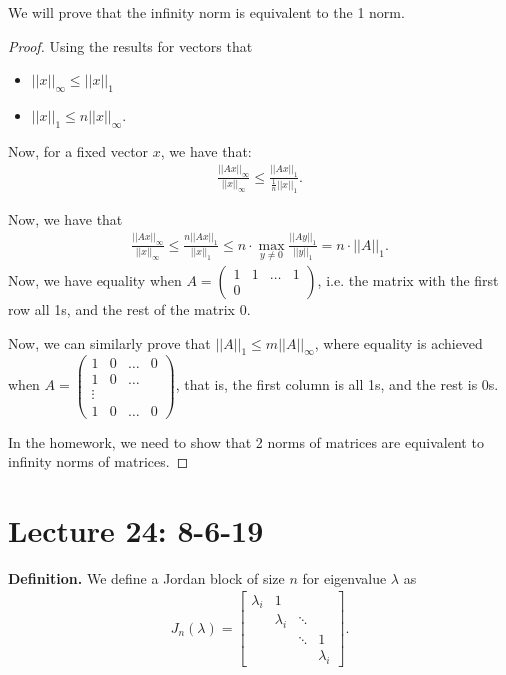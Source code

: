 \documentclass{article}
\newcommand{\mat}[1]{\begin{pmatrix}#1\end{pmatrix}}
\begin{document}
We will prove that the infinity norm is equivalent to the 1 norm.  
\begin{proof}
  Using the results for vectors that
  \begin{itemize}
    \item $||x||_{\infty} \leq ||x||_1$
    \item $||x||_{1} \leq n ||x||_{\infty}$.
  \end{itemize}

  Now, for a fixed vector $x$, we have that:
\begin{align*}
  \frac{||A x||_{\infty}}{||x||_{\infty}} \leq \frac{||A x||_1}{\frac{1}{n} ||x||_1}.
\end{align*}

  Now, we have that
  \begin{align*}
    \frac{||A x||_{\infty}}{||x||_{\infty}} \leq \frac{n ||A x||_1}{||x||_1} \leq n \cdot \max_{y \neq 0} \frac{||A y||_1}{||y||_1} = n \cdot ||A||_1.
  \end{align*}
  Now, we have equality when $A = \mat{1 & 1 & \dots & 1 \\ 0}$, i.e. the matrix with the first row all 1s, and the rest of the matrix 0.

  Now, we can similarly prove that $||A||_1 \leq m ||A||_{\infty}$, where equality is achieved when $A = \mat{1 & 0 & \dots & 0 \\ 1 & 0 & \dots \\ \vdots \\ 1 & 0 & \dots & 0}$, that is, the first column is all 1s, and the rest is 0s.

  In the homework, we need to show that 2 norms of matrices are equivalent to infinity norms of matrices.
\end{proof}
\section{Lecture 24: 8-6-19}

{\bf Definition.} We define a Jordan block of size $n$ for eigenvalue $\lambda$ as
\begin{align*}
  J_n(\lambda) = \begin{bmatrix}
\lambda_i & 1            & \;     & \;  \\
\;        & \lambda_i    & \ddots & \;  \\
\;        & \;           & \ddots & 1   \\
\;        & \;           & \;     & \lambda_i       
\end{bmatrix}.
\end{align*}
\end{document}

